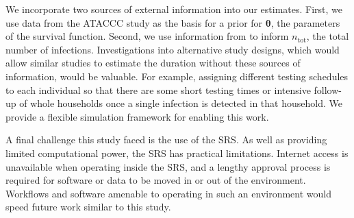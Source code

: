\documentclass[12pt]{article}
\renewcommand{\vec}[1]{\bm{#1}}
\newcommand{\psens}{p_\text{sens}}
\newcommand{\ntot}{n_\text{tot}}
\begin{document}
We incorporate two sources of external information into our estimates.
First, we use data from the ATACCC study as the basis for a prior for $\vec\theta$, the parameters of the survival function.
Second, we use information from \citet{birrellRTM2} to inform $\ntot$, the total number of infections.
Investigations into alternative study designs, which would allow similar studies to estimate the duration without these sources of information, would be valuable.
For example, assigning different testing schedules to each individual so that there are some short testing times or intensive follow-up of whole households once a single infection is detected in that household.
We provide a flexible simulation framework for enabling this work.

A final challenge this study faced is the use of the SRS.
As well as providing limited computational power, the SRS has practical limitations.
Internet access is unavailable when operating inside the SRS, and a lengthy approval process is required for software or data to be moved in or out of the environment.
Workflows and software amenable to operating in such an environment would speed future work similar to this study.


    
    
 

\end{document}
